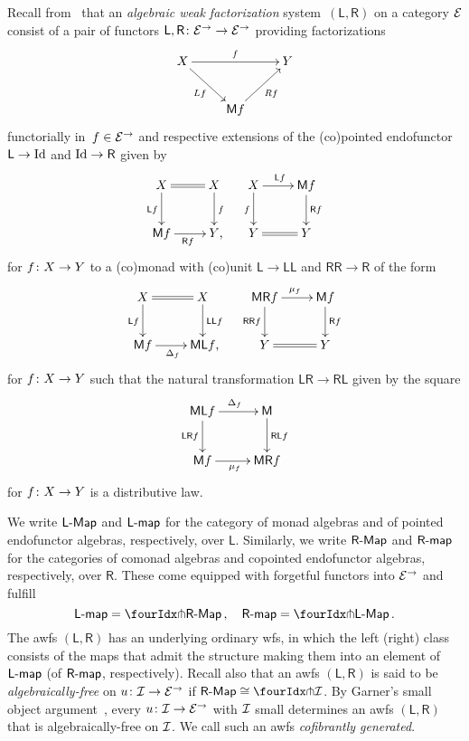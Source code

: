 \documentclass[reqno,10pt,a4paper,oneside,draft]{amsart}
\newcommand{\LL}{\mathsf{L}}
\newcommand{\RR}{\mathsf{R}}
\newcommand{\MM}{\mathsf{M}}
\begin{document}
{{Recall from~\cite{garner:small-object-argument,grandis-tholen-nwfs} that an \emph{algebraic weak factorization} system~$(\LL, \RR)$ on a category $\cal{E}$ consist of a pair of functors $\LL, \RR \co \cal{E}^\to \to \cal{E}^\to$ providing factorizations
\[
\xymatrix{
  X
  \ar[rr]^{f}
  \ar[dr]_{L f}
&&
  Y
\\&
  \MM f
  \ar[ur]_{R f}
}
\]
functorially in~$f \in \cal{E}^\to$ and respective extensions of the (co)pointed endofunctor $\LL \to \Id$ and $\Id \to \RR$ given by
\begin{align*}
\xymatrix{
  X
  \ar@{=}[r]
  \ar[d]_{\LL f}
&
  X
  \ar[d]^{f}
\\
  \MM f
  \ar[r]_{\RR f}
&
  Y
\rlap{,}}
&&
\xymatrix{
  X
  \ar[r]^{\LL f}
  \ar[d]_{f}
&
  \MM f
  \ar[d]^{\RR f}
\\
  Y
  \ar@{=}[r]
&
  Y
}
\end{align*}
for $f \co X \to Y$ to a (co)monad with (co)unit $\LL \to \LL \LL$ and $\RR \RR \to \RR$ of the form
\begin{align*}
\xymatrix{
  X
  \ar@{=}[r]
  \ar[d]_{\LL f}
&
  X
  \ar[d]^{\LL \LL f}
\\
  \MM f
  \ar[r]_{\Delta_f}
&
  \MM \LL f
\rlap{,}}
&&
\xymatrix{
  \MM \RR f
  \ar[r]^{\mu_f}
  \ar[d]_{\RR \RR f}
&
  \MM f
  \ar[d]^{\RR f}
\\
  Y
  \ar@{=}[r]
&
  Y
}
\end{align*}
for $f \co X \to Y$ such that the natural transformation $\LL \RR \to \RR \LL$ given by the square
\[
\xymatrix{
  \MM \LL f
  \ar[r]^{\Delta_f}
  \ar[d]_{\LL \RR f}
&
  \MM
  \ar[d]^{\RR \LL f}
\\
  \MM f
  \ar[r]_{\mu_f}
&
  \MM \RR f
}
\]
for $f \co X \to Y$ is a distributive law.

We write $\pCoalg{\LL}$ and $\pcoalg{\LL}$ for the category of monad algebras and of pointed endofunctor algebras, respectively, over $\LL$. Similarly, we write $\pAlg{\RR}$ and $\palg{\RR}$  for the categories of comonad algebras and copointed endofunctor algebras, respectively, over $\RR$. These come equipped with forgetful functors into $\cal{E}^\to$ and fulfill
\[
\pcoalg{\LL} = \liftl{\pAlg{\RR}}
\, , \quad
\palg{\RR} = \liftr{\pCoalg{\LL}}
\, .\]
The awfs $(\LL, \RR)$ has an underlying ordinary wfs, in which the left (right) class consists of the maps that admit the structure making them into an element of $\pcoalg{\LL}$ (of $\palg{\RR}$, respectively).
Recall also that an awfs $(\LL, \RR)$ is said to be \emph{algebraically-free} on $u \co \cal{I} \to \cal{E}^\to$ if $\pAlg{\RR} \iso \liftr{\cal{I}}$.
By Garner's small object argument~\cite{garner:small-object-argument}, every $u \co \cal{I} \to \cal{E}^\to$ with $\cal{I}$ small determines an awfs $(\LL, \RR)$ that is algebraically-free on $\cal{I}$.
We call such an awfs \emph{cofibrantly generated}.

}}
\end{document}
